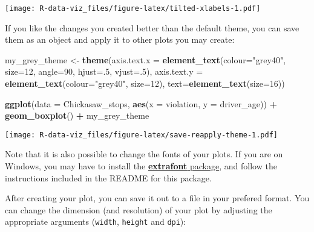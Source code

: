 \documentclass[]{book}
\newenvironment{Shaded}{\begin{snugshade}}{\end{snugshade}}
\newcommand{\DataTypeTok}[1]{\textcolor[rgb]{0.13,0.29,0.53}{#1}}
\newcommand{\DecValTok}[1]{\textcolor[rgb]{0.00,0.00,0.81}{#1}}
\newcommand{\KeywordTok}[1]{\textcolor[rgb]{0.13,0.29,0.53}{\textbf{#1}}}
\newcommand{\NormalTok}[1]{#1}
\newcommand{\OperatorTok}[1]{\textcolor[rgb]{0.81,0.36,0.00}{\textbf{#1}}}
\newcommand{\StringTok}[1]{\textcolor[rgb]{0.31,0.60,0.02}{#1}}
\begin{document}
\texttt{[image: R-data-viz\_files/figure-latex/tilted-xlabels-1.pdf]}

If you like the changes you created better than the default theme, you can save them as an object and apply it to other plots you may create:

\begin{Shaded}
\begin{Highlighting}[]
\NormalTok{my_grey_theme <-}\StringTok{ }\KeywordTok{theme}\NormalTok{(}\DataTypeTok{axis.text.x =} \KeywordTok{element_text}\NormalTok{(}\DataTypeTok{colour=}\StringTok{"grey40"}\NormalTok{, }\DataTypeTok{size=}\DecValTok{12}\NormalTok{, }\DataTypeTok{angle=}\DecValTok{90}\NormalTok{, }\DataTypeTok{hjust=}\NormalTok{.}\DecValTok{5}\NormalTok{, }\DataTypeTok{vjust=}\NormalTok{.}\DecValTok{5}\NormalTok{),}
                   \DataTypeTok{axis.text.y =} \KeywordTok{element_text}\NormalTok{(}\DataTypeTok{colour=}\StringTok{"grey40"}\NormalTok{, }\DataTypeTok{size=}\DecValTok{12}\NormalTok{), }\DataTypeTok{text=}\KeywordTok{element_text}\NormalTok{(}\DataTypeTok{size=}\DecValTok{16}\NormalTok{))}

\KeywordTok{ggplot}\NormalTok{(}\DataTypeTok{data =}\NormalTok{ Chickasaw_stops, }\KeywordTok{aes}\NormalTok{(}\DataTypeTok{x =}\NormalTok{ violation, }\DataTypeTok{y =}\NormalTok{ driver_age)) }\OperatorTok{+}
\StringTok{  }\KeywordTok{geom_boxplot}\NormalTok{() }\OperatorTok{+}\StringTok{ }
\StringTok{  }\NormalTok{my_grey_theme}
\end{Highlighting}
\end{Shaded}

\texttt{[image: R-data-viz\_files/figure-latex/save-reapply-theme-1.pdf]}

Note that it is also possible to change the fonts of your plots. If you are on Windows, you may have to install the \href{https://github.com/wch/extrafont}{\textbf{extrafont} package}, and follow the instructions included in the README for this package.

After creating your plot, you can save it out to a file in your prefered format. You can change the dimension (and resolution) of your plot by adjusting the appropriate arguments (\texttt{width}, \texttt{height} and \texttt{dpi}):
\end{document}
